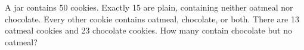 A jar contains 50 cookies. Exactly 15 are plain, containing neither oatmeal nor chocolate. Every other cookie contains oatmeal, chocolate, or both. There are 13 oatmeal cookies and 23 chocolate cookies. How many contain chocolate but no oatmeal?
